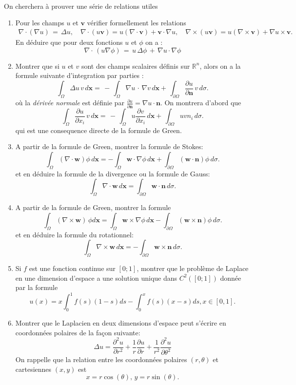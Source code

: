 \documentclass[12pt,a4paper]{article}
\begin{document}
\noindent On cherchera \`a prouver une s\'erie de relations utiles
\begin{enumerate}
\item Pour les champs $u$ et $\mathbf{v}$ v\'erifier formellement les relations
$$
\begin{array}{c}
\displaystyle \nabla\cdot (\nabla u )\, = \, \Delta u,\quad \nabla\cdot (u\mathbf{v}) = u (\nabla\cdot \mathbf{v})+ \mathbf{v}
\cdot\nabla u,\quad \nabla\times (u\mathbf{v}) = u(\nabla\times \mathbf{v})+ \nabla u
 \times \mathbf{v}.
\end{array}
$$
En d\'eduire que pour deux fonctions $u$ et ${\phi}$ on a :
$$
\nabla\cdot\, (u\nabla \phi) \, = \, u \, \Delta \phi \, + \, \nabla u \cdot \nabla \phi
$$
\item Montrer que si $u$ et $v$ sont des champs scalaires d\'efinis
  sur $\displaystyle \mathbb{R}^n$, alors on a la formule suivante
  d'integration par parties :
$$
\int_\Omega \Delta u  \, v \, d\mathbf{x}= \, - \, \int_\Omega \nabla
u \, \cdot \, \nabla v \,d\mathbf{x}+ \, \int_{\partial \Omega}
\frac{\partial u}{\partial \mathbf{n}}  \, v \, d\sigma.
$$
o\`u la {\sl d\'eriv\'ee normale} est d\'efinie par $\displaystyle
\frac{\partial u}{\partial \mathbf{n}}= \nabla u \cdot \mathbf{n}$. On
montrera d'abord que
$$
\int_\Omega \frac{\partial u}{\partial x_i}  \, v \, d\mathbf{x}= \, - \, \int_\Omega 
u \frac{\partial v}{\partial x_i}\,d\mathbf{x}+ \, \int_{\partial \Omega}
u v n_i \, d\sigma.
$$
qui est une consequence directe de la formule de Green.
\item A partir de la formule de Green, montrer la formule de Stokes:
$$
\int_{\Omega} (\nabla\cdot \mathbf{w} )\phi\, d\mathbf{x} = -\int_{\Omega}
\mathbf{w}\cdot \nabla \phi \,d\mathbf{x} + \int_{\partial\Omega} (\mathbf{w}\cdot
\mathbf{n}) \phi \,d\sigma.
$$ 
et en d\'eduire la formule de la divergence ou la formule de Gauss:
$$
\int_{\Omega}\nabla\cdot \mathbf{w}\, d\mathbf{x} =
\int_{\partial\Omega} \mathbf{w} \cdot \mathbf{n}\, d\sigma.
$$
\item A partir de la formule de Green, montrer la formule
$$
\int_{\Omega} (\nabla\times \mathbf{w})\, \phi d\mathbf{x} = \int_{\Omega}
\mathbf{w}\times \nabla \phi \,d\mathbf{x} - \int_{\partial\Omega} (\mathbf{w}\times
\mathbf{n})\phi\, d\sigma.
$$ 
et en d\'eduire la formule du rotationnel:
$$
\int_{\Omega}\nabla\times \mathbf{w}\, d\mathbf{x} =-
\int_{\partial\Omega} \mathbf{w} \times \mathbf{n}\, d\sigma.
$$
\item Si $f$ est une fonction continue sur $[0; 1]$, montrer que le
  probl\`eme de Laplace en une dimension d'espace a une
solution unique dans $C^2([0; 1])$  donn\'ee par la formule
$$
u(x) = x\int_0^1f(s)(1-s)ds - \int_0^x f(s)(x-s)ds, x\in[0,1].
$$
\item 
Montrer que le Laplacien en deux dimensions d'espace peut s'\'ecrire
en coordonn\'ees polaires de la fa\c{c}on suivante:
$$
\Delta u =\frac{\partial^2 u}{\partial r^2}
        +\frac{1}{r}\frac{\partial u}{\partial
          r}+\frac{1}{r^2}\frac{\partial^2 u}{\partial \theta^2}
$$
On rappelle que la relation entre les coordonn\'ees polaires $(r,\theta)$ et
cartesiennes $(x,y)$ est
$$
x=r\cos(\theta),\, y=r\sin(\theta).
$$
\end{enumerate}
\end{document}
